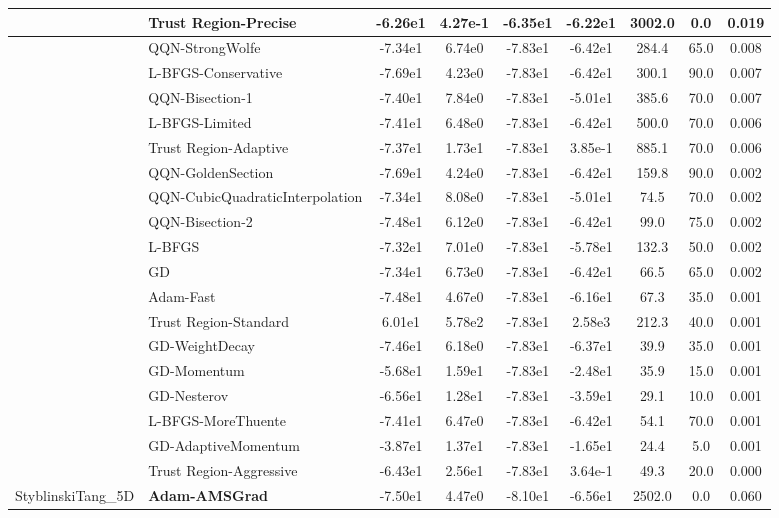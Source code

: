 \documentclass{article}
\begin{document}
\begin{longtable}{|l|l|c|c|c|c|c|c|c|}
\hline
 & Trust Region-Precise & -6.26e1 & 4.27e-1 & -6.35e1 & -6.22e1 & 3002.0 & 0.0 & 0.019 \\
\hline
 & QQN-StrongWolfe & -7.34e1 & 6.74e0 & -7.83e1 & -6.42e1 & 284.4 & 65.0 & 0.008 \\
\hline
 & L-BFGS-Conservative & -7.69e1 & 4.23e0 & -7.83e1 & -6.42e1 & 300.1 & 90.0 & 0.007 \\
\hline
 & QQN-Bisection-1 & -7.40e1 & 7.84e0 & -7.83e1 & -5.01e1 & 385.6 & 70.0 & 0.007 \\
\hline
 & L-BFGS-Limited & -7.41e1 & 6.48e0 & -7.83e1 & -6.42e1 & 500.0 & 70.0 & 0.006 \\
\hline
 & Trust Region-Adaptive & -7.37e1 & 1.73e1 & -7.83e1 & 3.85e-1 & 885.1 & 70.0 & 0.006 \\
\hline
 & QQN-GoldenSection & -7.69e1 & 4.24e0 & -7.83e1 & -6.42e1 & 159.8 & 90.0 & 0.002 \\
\hline
 & QQN-CubicQuadraticInterpolation & -7.34e1 & 8.08e0 & -7.83e1 & -5.01e1 & 74.5 & 70.0 & 0.002 \\
\hline
 & QQN-Bisection-2 & -7.48e1 & 6.12e0 & -7.83e1 & -6.42e1 & 99.0 & 75.0 & 0.002 \\
\hline
 & L-BFGS & -7.32e1 & 7.01e0 & -7.83e1 & -5.78e1 & 132.3 & 50.0 & 0.002 \\
\hline
 & GD & -7.34e1 & 6.73e0 & -7.83e1 & -6.42e1 & 66.5 & 65.0 & 0.002 \\
\hline
 & Adam-Fast & -7.48e1 & 4.67e0 & -7.83e1 & -6.16e1 & 67.3 & 35.0 & 0.001 \\
\hline
 & Trust Region-Standard & 6.01e1 & 5.78e2 & -7.83e1 & 2.58e3 & 212.3 & 40.0 & 0.001 \\
\hline
 & GD-WeightDecay & -7.46e1 & 6.18e0 & -7.83e1 & -6.37e1 & 39.9 & 35.0 & 0.001 \\
\hline
 & GD-Momentum & -5.68e1 & 1.59e1 & -7.83e1 & -2.48e1 & 35.9 & 15.0 & 0.001 \\
\hline
 & GD-Nesterov & -6.56e1 & 1.28e1 & -7.83e1 & -3.59e1 & 29.1 & 10.0 & 0.001 \\
\hline
 & L-BFGS-MoreThuente & -7.41e1 & 6.47e0 & -7.83e1 & -6.42e1 & 54.1 & 70.0 & 0.001 \\
\hline
 & GD-AdaptiveMomentum & -3.87e1 & 1.37e1 & -7.83e1 & -1.65e1 & 24.4 & 5.0 & 0.001 \\
\hline
 & Trust Region-Aggressive & -6.43e1 & 2.56e1 & -7.83e1 & 3.64e-1 & 49.3 & 20.0 & 0.000 \\
StyblinskiTang\_5D & \textbf{Adam-AMSGrad} & -7.50e1 & 4.47e0 & -8.10e1 & -6.56e1 & 2502.0 & 0.0 & 0.060 \\

\end{longtable}
\end{document}
